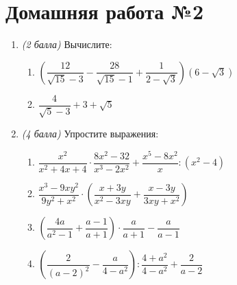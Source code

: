 \documentclass[12pt, a4paper]{article}
\begin{document}
	
	\section*{Домашняя работа №2}
	\begin{enumerate}
		\item \textit{(2 балла)} Вычислите:
			\begin{enumerate}[label=\asbuk*)]
			\item $\left( \dfrac{12}{\sqrt{15}-3}-\dfrac{28}{\sqrt{15}-1}+\dfrac{1}{2-\sqrt{3}}\right)(6-\sqrt{3}) $
			\item $\dfrac{4}{\sqrt{5}-3}+3+\sqrt{5}$
		\end{enumerate}
		\item \textit{(4 балла)} Упростите выражения:
		\begin{enumerate}[label=\asbuk*)]
			\item $\dfrac{x^2}{x^2+4x+4}\cdot\dfrac{8x^2-32}{x^3-2x^2}+\dfrac{x^5-8x^2}{x}:(x^2-4)$
			\item $\dfrac{x^3-9xy^2}{9y^2+x^2}\cdot\left( \dfrac{x+3y}{x^2-3xy}+\dfrac{x-3y}{3xy+x^2}\right) $
			\item $\left(\dfrac{4a}{a^2-1}+\dfrac{a-1}{a+1} \right) \cdot \dfrac{a}{a+1}-\dfrac{a}{a-1}$
			\item $\left( \dfrac{2}{(a-2)^2}-\dfrac{a}{4-a^2}\right):\dfrac{4+a^2}{4-a^2}+\dfrac{2}{a-2} $
		\end{enumerate}
	\end{enumerate}
\end{document}
